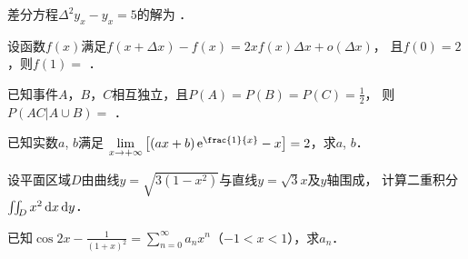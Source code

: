 \documentclass[plain,noanswer,medmath]{../../template/jnuexam}
\begin{document}
\begin{problem}
差分方程$\Delta^2y_x - y_x = 5$的解为 \fillin{}．
\end{problem}


\begin{problem}
设函数$f(x)$满足$f(x + \Delta x) - f(x) = 2xf(x)\Delta x + o(\Delta x)$，
且$f(0) = 2$，则$f(1) =$ \fillin{}．
\end{problem}




\begin{problem}
已知事件$A$，$B$，$C$相互独立，且$P(A) = P(B) = P(C) = \frac{1}{2}$，
则$P\left(\left. AC \right|A \cup B \right) =$ \fillin{}．
\end{problem}




\begin{problem}[points=10]
已知实数$a$, $b$满足
$\lim_{x \to +\infty} \left[\left(ax + b \right) \e^{\frac{1}{x}} - x \right] = 2$，求$a$, $b$．
\end{problem}


\begin{problem}[points=10]
设平面区域$D$由曲线$y = \sqrt{3(1 - x^2)}$与直线$y = \sqrt{3} x$及$y$轴围成，
计算二重积分$\iint_D x^2 \mathop{}\!\mathrm{d} x\mathop{}\!\mathrm{d} y$．
\end{problem}




\begin{problem}[points=10]
已知$\cos 2x - \frac{1}{(1 + x)^2} = \sum_{n=0}^{\infty}a_n x^n$（$-1<x<1$），求$a_n$．
\end{problem}










\end{document}
